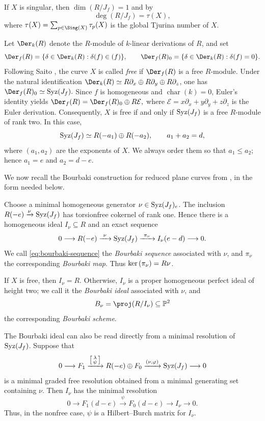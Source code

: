 \documentclass[11pt]{amsart}   %
\theoremstyle{definition}
\def\ker{{\rm ker}\,}
\def\syz{\mbox{\rm Syz}}
\def\NZQ{\mathbb}               %
\def\PP{{\NZQ P}}
\begin{document}
If $X$ is singular, then $\dim(R/J_f)=1$ and by~\cite[Proposition~3.2]{JNSBourbaki} $$\deg(R/J_f)=\tau(X),$$ where $\tau(X)=\sum_{p\in\Sing(X)}\tau_p(X)$ is the global Tjurina number of $X$.

Let $\Der_k(R)$ denote the $R$-module of $k$-linear derivations of $R$, and set
\[
\Der_f(R)=\{\delta\in\Der_k(R):\delta(f)\in(f)\},
\qquad
\Der_f(R)_0=\{\delta\in\Der_k(R):\delta(f)=0\}.
\]
Following Saito \cite{SaitoLogarithmic}, the curve $X$ is called \emph{free} if $\Der_f(R)$ is a free $R$-module. Under the natural identification $\Der_k(R)\simeq R\partial_x\oplus R\partial_y\oplus R\partial_z$, one has $\Der_f(R)_0\simeq\syz(J_f).$ Since $f$ is homogeneous and $\operatorname{char}(k)=0$, Euler's identity yields $\Der_f(R)=\Der_f(R)_0\oplus R\mathcal{E},$ where $\mathcal E=x\partial_x+y\partial_y+z\partial_z$ is the Euler derivation. Consequently, $X$ is free if and only if $\syz(J_f)$ is a free $R$-module of rank two. In this case,
\[
\syz(J_f)\simeq R(-a_1)\oplus R(-a_2),
\qquad a_1+a_2=d,
\]
where $(a_1,a_2)$ are the exponents of $X$. We always order them so that $a_1\leq a_2$; hence $a_1=e$ and $a_2=d-e$.

We now recall the Bourbaki construction for reduced plane curves from \cite[Section~2]{JNSBourbaki}, in the form needed below.

Choose a minimal homogeneous generator $\nu\in\syz(J_f)_e$. The inclusion $R(-e)\xrightarrow{\nu}\syz(J_f)$ has torsionfree cokernel of rank one. Hence there is a homogeneous ideal $I_\nu\subseteq R$ and an exact sequence
\begin{equation}
\label{eq:bourbaki-sequence}
0\longrightarrow R(-e)
\xrightarrow{\ \nu\ }
\syz(J_f)
\xrightarrow{\ \pi_\nu\ }
I_\nu(e-d)
\longrightarrow0.
\end{equation}
We call \eqref{eq:bourbaki-sequence} the \emph{Bourbaki sequence} associated with $\nu$, and $\pi_\nu$ the corresponding \emph{Bourbaki map}. Thus $\ker(\pi_\nu)=R\nu$.

If $X$ is free, then $I_\nu=R$. Otherwise, $I_\nu$ is a proper homogeneous perfect ideal of height two; we call it the \emph{Bourbaki ideal} associated with $\nu$, and
\[
B_\nu=\proj(R/I_\nu)\subseteq\PP^2
\]
the corresponding \emph{Bourbaki scheme}.

The Bourbaki ideal can also be read directly from a minimal resolution of $\syz(J_f)$. Suppose that
\[
0\longrightarrow F_1
\xrightarrow{\left[\begin{smallmatrix}\lambda\\ \psi\end{smallmatrix}\right]} R(-e)\oplus F_0 \xrightarrow{(\nu,\varphi)}
\syz(J_f)
\longrightarrow0
\]
is a minimal graded free resolution obtained from a minimal generating set containing $\nu$. Then $I_\nu$ has the minimal resolution
\begin{equation}\label{HBB}
0\longrightarrow F_1(d-e)
\xrightarrow{\ \psi\ } F_0(d-e) \longrightarrow I_\nu \longrightarrow0.
\end{equation}
Thus, in the nonfree case, $\psi$ is a Hilbert--Burch matrix for $I_\nu$.
\end{document}
